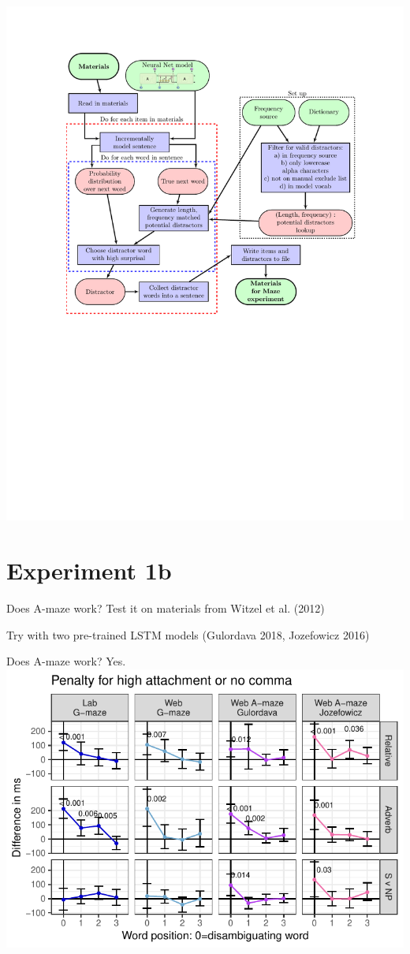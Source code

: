 \documentclass[12pt, xcolor=beamer,table,usenames,dvipsnames, ignorenonframetext, ngerman]{beamer}
\begin{document}
\begin{frame}
\centering
\includegraphics[clip, trim=3.25cm 5cm 2.5cm 2.5cm,width=.9\textwidth]{flow_2.pdf}
\end{frame}
\section{Experiment 1b}

\begin{frame}{Does A-maze work? }
\pause
Test it on materials from Witzel et al. (2012)
\medskip

\pause
Try with two pre-trained LSTM models (Gulordava 2018, Jozefowicz 2016)

\end{frame}

\begin{frame}{Does A-maze work?  Yes.} \pause
\includegraphics[width=1\textwidth]{a_all.pdf}
\end{frame}
\end{document}
